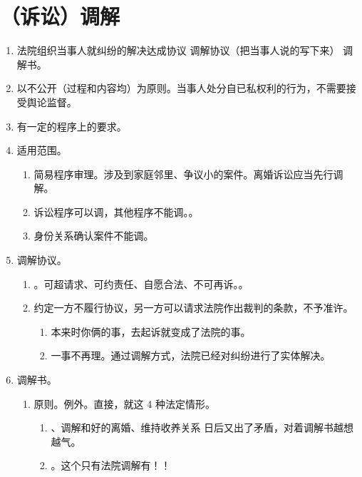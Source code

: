 \section{（诉讼）调解}
\begin{enumerate}
  \item 法院组织当事人就纠纷的解决达成协议 \yjt 调解协议（把当事人说的写下来） \yjt 调解书。
  \item 以不公开（过程和内容均）为原则。当事人处分自已私权利的行为，不需要接受舆论监督。
  \item 有一定的程序上的要求。
  \item 适用范围。
        \begin{enumerate}
          \item 简易程序审理。涉及到家庭邻里、争议小的案件。离婚诉讼应当先行调解。
          \item 诉讼程序可以调，其他程序不能调。。
          \item 身份关系确认案件不能调。
        \end{enumerate}
  \item 调解协议。
        \begin{enumerate}
          \item {}。可超请求、可约责任、自愿合法、不可再诉。。
          \item 约定一方不履行协议，另一方可以请求法院作出裁判的条款，不予准许。
                \begin{enumerate}
                  \item 本来时你俩的事，去起诉就变成了法院的事。
                  \item 一事不再理。通过调解方式，法院已经对纠纷进行了实体解决。
                \end{enumerate}
        \end{enumerate}
  \item 调解书。
        \begin{enumerate}
          \item 原则。例外。直接，就这 4 种法定情形。
                \begin{enumerate}
                  \item {}、调解和好的离婚、维持收养关系 \yjt 日后又出了矛盾，对着调解书越想越气。
                  \item {}。这个只有法院调解有！！

\end{enumerate}
\end{enumerate}
\end{enumerate}
